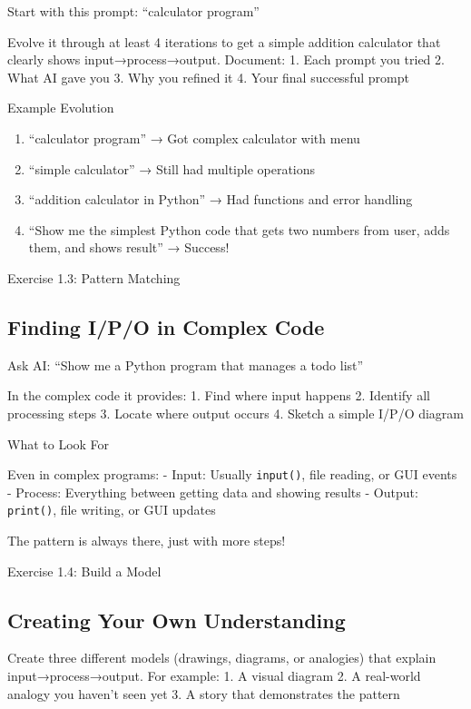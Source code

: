 \documentclass[
  letterpaper,
  DIV=11,
  numbers=noendperiod,
  oneside]{scrreprt}
\providecommand{\tightlist}{%
  \setlength{\itemsep}{0pt}\setlength{\parskip}{0pt}}\usepackage{longtable,booktabs,array}
\begin{document}
Start with this prompt: ``calculator program''

Evolve it through at least 4 iterations to get a simple addition
calculator that clearly shows input→process→output. Document: 1. Each
prompt you tried 2. What AI gave you 3. Why you refined it 4. Your final
successful prompt

Example Evolution

\begin{enumerate}
\def\labelenumi{\arabic{enumi}.}
\tightlist
\item
  ``calculator program'' → Got complex calculator with menu
\item
  ``simple calculator'' → Still had multiple operations
\item
  ``addition calculator in Python'' → Had functions and error handling
\item
  ``Show me the simplest Python code that gets two numbers from user,
  adds them, and shows result'' → Success!
\end{enumerate}

Exercise 1.3: Pattern Matching

\subsection{Finding I/P/O in Complex
Code}\label{finding-ipo-in-complex-code}

Ask AI: ``Show me a Python program that manages a todo list''

In the complex code it provides: 1. Find where input happens 2. Identify
all processing steps 3. Locate where output occurs 4. Sketch a simple
I/P/O diagram

What to Look For

Even in complex programs: - Input: Usually \texttt{input()}, file
reading, or GUI events - Process: Everything between getting data and
showing results - Output: \texttt{print()}, file writing, or GUI updates

The pattern is always there, just with more steps!

Exercise 1.4: Build a Model

\subsection{Creating Your Own
Understanding}\label{creating-your-own-understanding}

Create three different models (drawings, diagrams, or analogies) that
explain input→process→output. For example: 1. A visual diagram 2. A
real-world analogy you haven't seen yet 3. A story that demonstrates the
pattern
\end{document}
